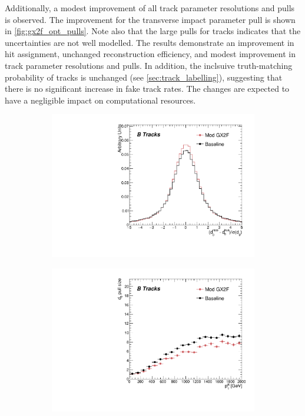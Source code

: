 Additionally, a modest improvement of all track parameter resolutions and pulls is observed.
The improvement for the transverse impact parameter pull is shown in \cref{fig:gx2f_opt_pulls}.
Note also that the large pulls for \highpt tracks indicates that the uncertainties are not well modelled.
The results demonstrate an improvement in hit assignment, unchanged reconstruction efficiency, and modest improvement in track parameter resolutions and pulls.
In addition, the inclsuive truth-matching probability of tracks is unchanged (see \cref{sec:track_labelling}), suggesting that there is no significant increase in fake track rates. The changes are expected to have a negligible impact on computational resources.

\begin{figure}[!htbp]
    \centering
    \begin{subfigure}{.48\textwidth}
      \centering
      \includegraphics[width=\textwidth]{chapters/3.tracking/figs/h_recoTruthPull_d0_From_B.pdf}
    \end{subfigure}%
    \begin{subfigure}{.48\textwidth}
      \centering
      \includegraphics[width=\textwidth]{chapters/3.tracking/figs/p_d0_pull_size_pTB_From_B.pdf}

\end{subfigure}
\end{figure}
